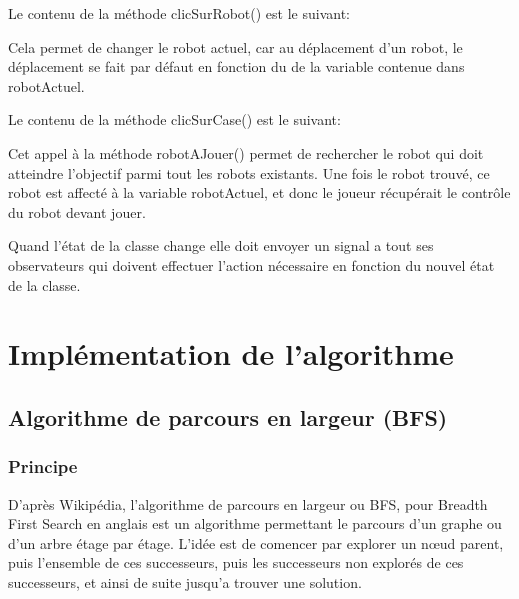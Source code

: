 \documentclass[a4paper, 12pt]{article}
\begin{document}
            Le contenu de la méthode clicSurRobot() est le suivant: 
            
            Cela permet de changer le robot actuel, car au déplacement d'un robot, le déplacement se fait par défaut en fonction du de la variable contenue dans robotActuel. 
            
            Le contenu de la méthode clicSurCase() est le suivant:
            
            Cet appel à la méthode robotAJouer() permet de rechercher le robot qui doit atteindre l'objectif parmi tout les robots existants. Une fois le robot trouvé, ce robot est affecté à la variable robotActuel, et donc le joueur récupérait le contrôle du robot devant jouer.   
            

        
Quand l'état de la classe change elle doit envoyer un signal a tout ses observateurs qui doivent effectuer l'action nécessaire en fonction du nouvel état de la classe.
         

\newpage %

\section{Implémentation de l'algorithme}
    \subsection{Algorithme de parcours en largeur (BFS)}
        \subsubsection{Principe}
            D'après Wikipédia\cite{bfs}, l'algorithme de parcours en largeur ou BFS, pour Breadth First Search en anglais est un algorithme permettant le parcours d'un graphe ou d'un arbre étage par étage. L'idée est de comencer par explorer un nœud parent, puis l'ensemble de ces successeurs, puis les successeurs non explorés de ces successeurs, et ainsi de suite jusqu'a trouver une solution. 
            
\end{document}
